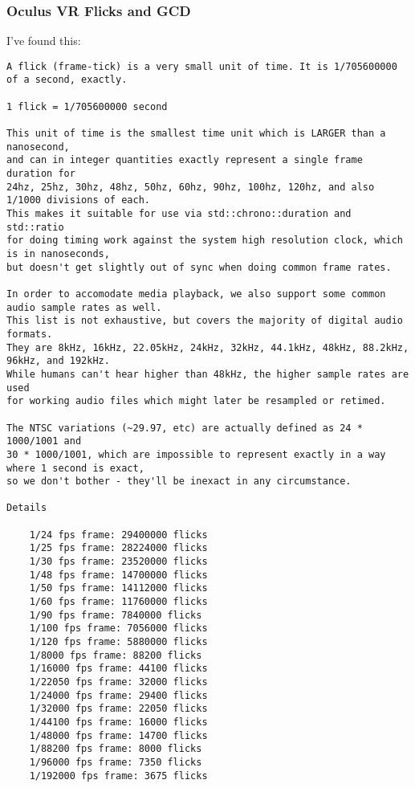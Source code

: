 \subsubsection{Oculus VR Flicks and GCD}

I've found this:

\begin{lstlisting}
A flick (frame-tick) is a very small unit of time. It is 1/705600000 of a second, exactly.

1 flick = 1/705600000 second

This unit of time is the smallest time unit which is LARGER than a nanosecond,
and can in integer quantities exactly represent a single frame duration for 
24hz, 25hz, 30hz, 48hz, 50hz, 60hz, 90hz, 100hz, 120hz, and also 1/1000 divisions of each.
This makes it suitable for use via std::chrono::duration and std::ratio 
for doing timing work against the system high resolution clock, which is in nanoseconds,
but doesn't get slightly out of sync when doing common frame rates.

In order to accomodate media playback, we also support some common audio sample rates as well.
This list is not exhaustive, but covers the majority of digital audio formats.
They are 8kHz, 16kHz, 22.05kHz, 24kHz, 32kHz, 44.1kHz, 48kHz, 88.2kHz, 96kHz, and 192kHz. 
While humans can't hear higher than 48kHz, the higher sample rates are used 
for working audio files which might later be resampled or retimed.

The NTSC variations (~29.97, etc) are actually defined as 24 * 1000/1001 and 
30 * 1000/1001, which are impossible to represent exactly in a way where 1 second is exact,
so we don't bother - they'll be inexact in any circumstance.

Details

    1/24 fps frame: 29400000 flicks
    1/25 fps frame: 28224000 flicks
    1/30 fps frame: 23520000 flicks
    1/48 fps frame: 14700000 flicks
    1/50 fps frame: 14112000 flicks
    1/60 fps frame: 11760000 flicks
    1/90 fps frame: 7840000 flicks
    1/100 fps frame: 7056000 flicks
    1/120 fps frame: 5880000 flicks
    1/8000 fps frame: 88200 flicks
    1/16000 fps frame: 44100 flicks
    1/22050 fps frame: 32000 flicks
    1/24000 fps frame: 29400 flicks
    1/32000 fps frame: 22050 flicks
    1/44100 fps frame: 16000 flicks
    1/48000 fps frame: 14700 flicks
    1/88200 fps frame: 8000 flicks
    1/96000 fps frame: 7350 flicks
    1/192000 fps frame: 3675 flicks
\end{lstlisting}

